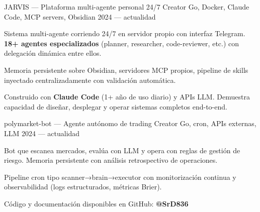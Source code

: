 \documentclass[10pt, a4paper]{awesome-cv}
\begin{document}
\begin{minipage}[t]{0.66\textwidth}
\begin{cventries}
\cventry
  { JARVIS — Plataforma multi-agente personal 24/7 }
  { Creator }
  { Go, Docker, Claude Code, MCP servers, Obsidian }
  { 2024 — actualidad }
  {
\begin{cvitems}
    \item { Sistema multi-agente corriendo 24/7 en servidor propio con interfaz Telegram. \textbf{18+ agentes especializados} (planner, researcher, code-reviewer, etc.) con delegación dinámica entre ellos. }
    \item { Memoria persistente sobre Obsidian, servidores MCP propios, pipeline de skills inyectado centralizadamente con validación automática. }
    \item { Construido con \textbf{Claude Code} (1+ año de uso diario) y APIs LLM. Demuestra capacidad de diseñar, desplegar y operar sistemas completos end-to-end. }
\end{cvitems}
  }
\cventry
  { polymarket-bot — Agente autónomo de trading }
  { Creator }
  { Go, cron, APIs externas, LLM }
  { 2024 — actualidad }
  {
\begin{cvitems}
    \item { Bot que escanea mercados, evalúa con LLM y opera con reglas de gestión de riesgo. Memoria persistente con análisis retrospectivo de operaciones. }
    \item { Pipeline cron tipo scanner→brain→executor con monitorización continua y observabilidad (logs estructurados, métricas Brier). }
\end{cvitems}
  }
\end{cventries}
\par\vspace{4pt}
{\small\color{graytext} Código y documentación disponibles en GitHub: \textbf{@SrD836}}


\end{minipage}
\end{document}
